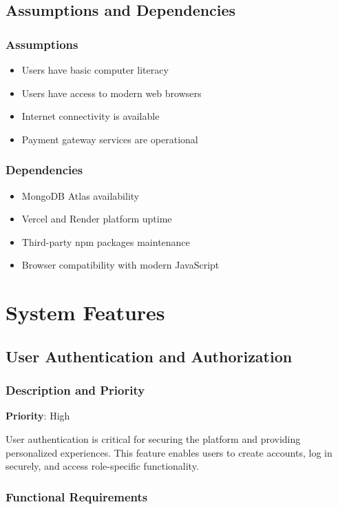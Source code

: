 \documentclass{scrreprt}
\begin{document}
\section{Assumptions and Dependencies}

\subsection{Assumptions}
\begin{itemize}
\item Users have basic computer literacy
\item Users have access to modern web browsers
\item Internet connectivity is available
\item Payment gateway services are operational
\end{itemize}

\subsection{Dependencies}
\begin{itemize}
\item MongoDB Atlas availability
\item Vercel and Render platform uptime
\item Third-party npm packages maintenance
\item Browser compatibility with modern JavaScript
\end{itemize}


\chapter{System Features}

\section{User Authentication and Authorization}

\subsection{Description and Priority}
\textbf{Priority}: High

User authentication is critical for securing the platform and providing personalized experiences. This feature enables users to create accounts, log in securely, and access role-specific functionality.

\subsection{Functional Requirements}
\end{document}
